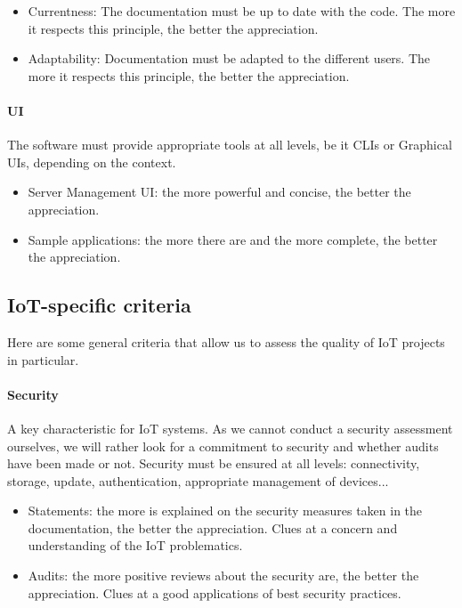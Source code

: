 \documentclass{article}
\begin{document}
\begin{itemize}
\item Currentness: The documentation must be up to date with the code. The more it respects this principle, the better the appreciation.
\item Adaptability: Documentation must be adapted to the different users. The more it respects this principle, the better the appreciation.
\end{itemize}

\paragraph{UI} The software must provide appropriate tools at all levels, be it CLIs or Graphical UIs, depending on the context.

\begin{itemize}
\item Server Management UI: the more powerful and concise, the better the appreciation.
\item Sample applications: the more there are and the more complete, the better the appreciation.
\end{itemize}

\subsection{IoT-specific criteria}

Here are some general criteria that allow us to assess the quality of IoT projects in particular.

\paragraph{Security} A key characteristic for IoT systems. As we cannot conduct a security assessment ourselves, we will rather look for a commitment to security and whether audits have been made or not. Security must be ensured at all levels: connectivity, storage, update, authentication, appropriate management of devices...

\begin{itemize}
\item Statements: the more is explained on the security measures taken in the documentation, the better the appreciation. Clues at a concern and understanding of the IoT problematics.
\item Audits: the more positive reviews about the security are, the better the appreciation. Clues at a good applications of best security practices.
\end{itemize}
\end{document}

